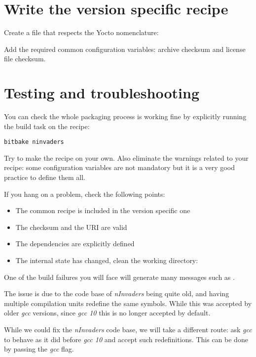 \section{Write the version specific recipe}

Create a file that respects the Yocto nomenclature: 

Add the required common configuration variables: archive checksum and license
file checksum.

\section{Testing and troubleshooting}

You can check the whole packaging process is working fine by explicitly running
the build task on the  recipe:
\begin{verbatim}
bitbake ninvaders
\end{verbatim}

Try to make the recipe on your own. Also eliminate the warnings related to your
recipe: some configuration variables are not mandatory but it is a very good
practice to define them all.

If you hang on a problem, check the following points:
\begin{itemize}
  \item The common recipe is included in the version specific one
  \item The checksum and the URI are valid
  \item The dependencies are explicitly defined
  \item The internal state has changed, clean the working directory: \\
\end{itemize}

One of the build failures you will face will generate many messages such as
.

The  issue is due to the code base of {\em
nInvaders} being quite old, and having multiple compilation units
redefine the same symbols. While this was accepted by older {\em gcc}
versions, since {\em gcc 10} this is no longer accepted by default.

While we could fix the {\em nInvaders} code base, we will take a
different route: ask {\em gcc} to behave as it did before {\em gcc 10}
and accept such redefinitions. This can be done by passing the
 {\em gcc} flag.

